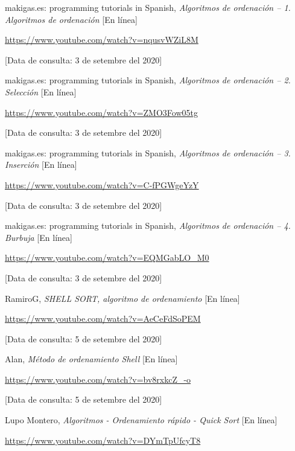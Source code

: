 \begin{thebibliography}{9}

	\bibitem{}
		makigas.es: programming tutorials in Spanish,
		\textit{Algoritmos de ordenación – 1. Algoritmos de ordenación}
		[En línea]

		\href{https://www.youtube.com/watch?v=nqusvWZiL8M}{https://www.youtube.com/watch?v=nqusvWZiL8M}
		
		[Data de consulta: 3 de setembre del 2020]
	
	\bibitem{}
		makigas.es: programming tutorials in Spanish,
		\textit{Algoritmos de ordenación – 2. Selección}
		[En línea]

		\href{https://www.youtube.com/watch?v=ZMO3Fow05tg}{https://www.youtube.com/watch?v=ZMO3Fow05tg}
		
		[Data de consulta: 3 de setembre del 2020]

	\bibitem{}
		makigas.es: programming tutorials in Spanish,
		\textit{Algoritmos de ordenación – 3. Inserción}
		[En línea]

		\href{https://www.youtube.com/watch?v=C-fPGWgeYzY}{https://www.youtube.com/watch?v=C-fPGWgeYzY}
		
		[Data de consulta: 3 de setembre del 2020]

	\bibitem{}
		makigas.es: programming tutorials in Spanish,
		\textit{Algoritmos de ordenación – 4. Burbuja}
		[En línea]

		\href{https://www.youtube.com/watch?v=EQMGabLO\_M0}{https://www.youtube.com/watch?v=EQMGabLO\_M0}
		
		[Data de consulta: 3 de setembre del 2020]

	\bibitem{}
		RamiroG,
		\textit{SHELL SORT, algoritmo de ordenamiento}
		[En línea]

		\href{https://www.youtube.com/watch?v=AeCeFdSoPEM}{https://www.youtube.com/watch?v=AeCeFdSoPEM}
		
		[Data de consulta: 5 de setembre del 2020]

	\bibitem{}
		Alan,
		\textit{Método de ordenamiento Shell}
		[En línea]

		\href{https://www.youtube.com/watch?v=bv8rxkcZ\_-o}{https://www.youtube.com/watch?v=bv8rxkcZ\_-o}
		
		[Data de consulta: 5 de setembre del 2020]

	\bibitem{}
		Lupo Montero,
		\textit{Algoritmos - Ordenamiento rápido - Quick Sort}
		[En línea]

		\href{https://www.youtube.com/watch?v=DYmTpUfcyT8}{https://www.youtube.com/watch?v=DYmTpUfcyT8}
		

\end{thebibliography}
